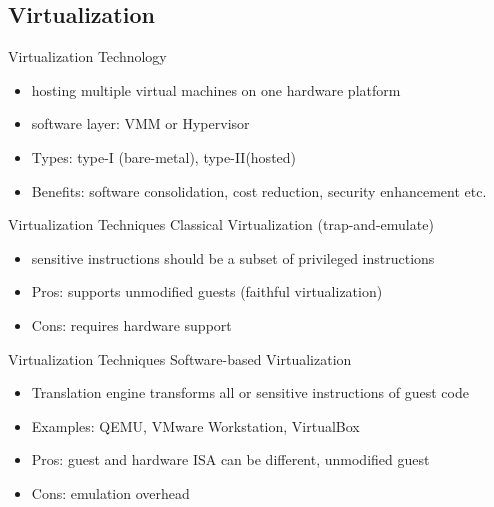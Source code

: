 \documentclass[10pt,hyperref={hyperfootnotes=false}, xcolor={usenames, dvipsnames}]{beamer}
\begin{document}
\subsection{Virtualization}
\begin{frame}{Virtualization Technology}
  \begin{itemize}
  \item {hosting multiple virtual machines on one hardware platform}  \pause{}
  \item {software layer: VMM or Hypervisor}  \pause{}
   	\begingroup
	
	\endgroup
    \pause{}
  \item {Types: type-I (bare-metal), type-II(hosted)} \pause{}
  \item {Benefits: software consolidation, cost reduction, security enhancement etc.}
  \end{itemize}
\end{frame}
\begin{frame}{Virtualization Techniques} {Classical Virtualization (trap-and-emulate)}
  \begin{itemize}
  \item{sensitive instructions should be a subset of privileged instructions} \pause{}		
	
    \pause{}
  \item{Pros: supports unmodified guests (faithful virtualization)} \pause{}
  \item{Cons: requires hardware support}
  \end{itemize}
\end{frame}
\begin{frame}{Virtualization Techniques} {Software-based Virtualization}
  \begin{itemize}
  \item {Translation engine transforms all or sensitive instructions of guest code \pause{}}
	
	\pause{}
  \item{Examples: QEMU, VMware Workstation, VirtualBox}  \pause{}
  \item{Pros: guest and hardware ISA can be different, unmodified guest} \pause{}
  \item{Cons: emulation overhead}

  \end{itemize}
\end{frame}
\end{document}
